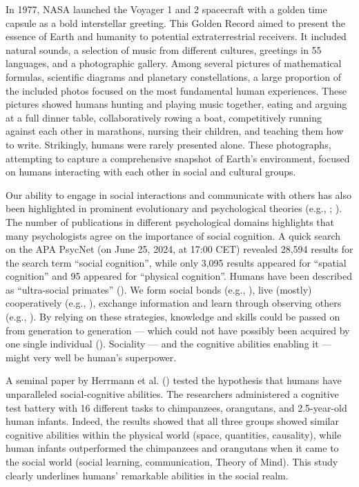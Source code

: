 \documentclass[
]{scrbook}
\begin{document}
In 1977, NASA launched the Voyager 1 and 2 spacecraft with a golden time capsule as a bold interstellar greeting. This Golden Record aimed to present the essence of Earth and humanity to potential extraterrestrial receivers. It included natural sounds, a selection of music from different cultures, greetings in 55 languages, and a photographic gallery. Among several pictures of mathematical formulas, scientific diagrams and planetary constellations, a large proportion of the included photos focused on the most fundamental human experiences. These pictures showed humans hunting and playing music together, eating and arguing at a full dinner table, collaboratively rowing a boat, competitively running against each other in marathons, nursing their children, and teaching them how to write. Strikingly, humans were rarely presented alone. These photographs, attempting to capture a comprehensive snapshot of Earth's environment, focused on humans interacting with each other in social and cultural groups.

Our ability to engage in social interactions and communicate with others has also been highlighted in prominent evolutionary and psychological theories (e.g., ; ). The number of publications in different psychological domains highlights that many psychologists agree on the importance of social cognition. A quick search on the APA PsycNet (on June 25, 2024, at 17:00 CET) revealed 28,594 results for the search term ``social cognition'', while only 3,095 results appeared for ``spatial cognition'' and 95 appeared for ``physical cognition''. Humans have been described as ``ultra-social primates'' (). We form social bonds (e.g., ), live (mostly) cooperatively (e.g., ), exchange information and learn through observing others (e.g., ). By relying on these strategies, knowledge and skills could be passed on from generation to generation --- which could not have possibly been acquired by one single individual (). Sociality --- and the cognitive abilities enabling it --- might very well be human's superpower.

A seminal paper by Herrmann et al. () tested the hypothesis that humans have unparalleled social-cognitive abilities. The researchers administered a cognitive test battery with 16 different tasks to chimpanzees, orangutans, and 2.5-year-old human infants. Indeed, the results showed that all three groups showed similar cognitive abilities within the physical world (space, quantities, causality), while human infants outperformed the chimpanzees and orangutans when it came to the social world (social learning, communication, Theory of Mind). This study clearly underlines humans' remarkable abilities in the social realm.
\end{document}
